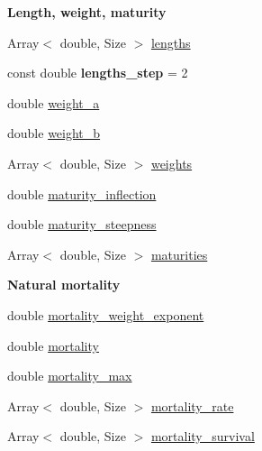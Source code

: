 \begin{Indent}{\bf Length, weight, maturity}\par
\begin{DoxyCompactItemize}
\item 
Array$<$ double, Size $>$ \hyperlink{classIOSKJ_1_1Model_ab26d2c0b3da23a380d21bbfafa236cff}{lengths}
\item 
\hypertarget{classIOSKJ_1_1Model_ad74671e3ed2a104a557b75adf0c64b14}{const double {\bfseries lengths\-\_\-step} = 2}\label{classIOSKJ_1_1Model_ad74671e3ed2a104a557b75adf0c64b14}

\item 
double \hyperlink{classIOSKJ_1_1Model_a39f409e1010b3f2d1559366a7f7daad8}{weight\-\_\-a}
\item 
double \hyperlink{classIOSKJ_1_1Model_aca953740b9305b51d39e04bc1b19ebb5}{weight\-\_\-b}
\item 
Array$<$ double, Size $>$ \hyperlink{classIOSKJ_1_1Model_a9befb275d915c5cec6b1e0e7a4bc8791}{weights}
\item 
double \hyperlink{classIOSKJ_1_1Model_aaba1b769dc8f413829f5fe639e978058}{maturity\-\_\-inflection}
\item 
double \hyperlink{classIOSKJ_1_1Model_a7cbfb9cd8bd5be39c93302e1352d2ad2}{maturity\-\_\-steepness}
\item 
Array$<$ double, Size $>$ \hyperlink{classIOSKJ_1_1Model_a374c4b48c908c40b7401e484cc49c767}{maturities}
\end{DoxyCompactItemize}
\end{Indent}
\begin{Indent}{\bf Natural mortality}\par
\begin{DoxyCompactItemize}
\item 
double \hyperlink{classIOSKJ_1_1Model_a6a3e26a7c2e42634669ea2526626a18e}{mortality\-\_\-weight\-\_\-exponent}
\item 
double \hyperlink{classIOSKJ_1_1Model_a970fad74268a92b08807a7cdbb32468b}{mortality}
\item 
double \hyperlink{classIOSKJ_1_1Model_a7c6726c255509c23749664a82ed4c4a9}{mortality\-\_\-max}
\item 
Array$<$ double, Size $>$ \hyperlink{classIOSKJ_1_1Model_a7fd43f29a1f093bfc97c0d6a8bd2a4ea}{mortality\-\_\-rate}
\item 
Array$<$ double, Size $>$ \hyperlink{classIOSKJ_1_1Model_ad3c9235716a5015c822d74610b4807ef}{mortality\-\_\-survival}
\end{DoxyCompactItemize}
\end{Indent}
